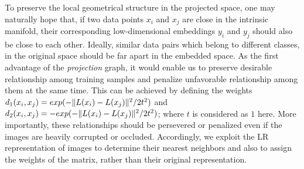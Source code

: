 \documentclass[journal]{IEEEtran}
\DeclarePairedDelimiter\norm{\lVert}{\rVert}
\begin{document}
To preserve the local geometrical structure in the projected space, one may naturally hope that, if two data points $x_i$ and $x_j$ are close in the intrinsic manifold, their corresponding low-dimensional embeddings $y_i$ and $y_j$ should also be close to each other. Ideally, similar data pairs which belong to different classes, in the original space should be far apart in the embedded space. As the first advantage of the \textit{projection} graph, it would enable us to preserve desirable relationship among training samples and penalize unfavorable relationship among them at the same time. This can be achieved by defining the weights $d_1(x_i,x_j) = exp (-\norm{L(x_i) - L(x_j)}^2/2t^2)$ and $d_2(x_i,x_j) = - exp (-\norm{L(x_i) - L(x_j)}^2/2t^2)$; where $t$ is considered as $1$ here. More importantly, these relationships should be persevered or penalized even if the images are heavily corrupted or occluded. Accordingly, we exploit the LR representation of images to determine their nearest neighbors and also to assign the weights of the matrix, rather than their original representation.
\end{document}
